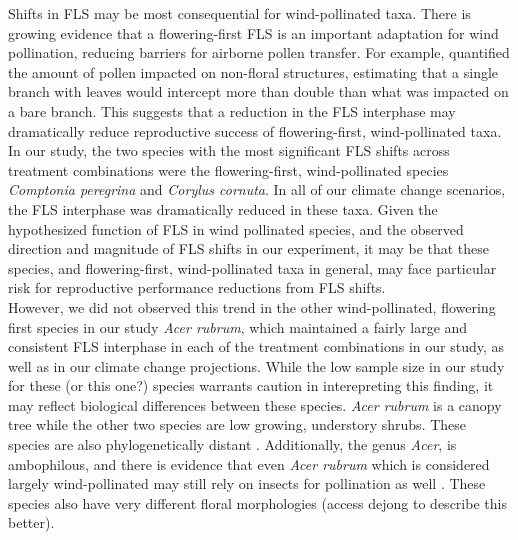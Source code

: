 \documentclass[11pt]{article}
\begin{document}
\noindent Shifts in FLS may be most consequential for wind-pollinated taxa. There is growing evidence that a flowering-first FLS is an important adaptation for wind pollination, reducing barriers for airborne pollen transfer\citep{Rathcke_1985}. For example, \citet{Tauber1967} quantified the amount of pollen impacted on non-floral structures, estimating that a single branch with leaves would intercept more than double than what was impacted on a bare branch. This suggests that a reduction in the FLS interphase may dramatically reduce reproductive success of flowering-first, wind-pollinated taxa.\\

\noindent In our study, the two species with the most significant FLS shifts across treatment combinations were the flowering-first, wind-pollinated species \textit{Comptonia peregrina} and \textit{Corylus cornuta}. In all of our climate change scenarios, the FLS interphase was dramatically reduced in these taxa. Given the hypothesized function of FLS in wind pollinated species, and the observed direction and magnitude of FLS shifts in our experiment, it may be that these species, and flowering-first, wind-pollinated taxa in general, may face particular risk for reproductive performance reductions from FLS shifts.\\ 

\noindent However, we did not observed this trend in the other wind-pollinated, flowering first species in our study \textit{Acer rubrum}, which maintained a fairly large and consistent FLS interphase in each of the treatment combinations in our study, as well as in our climate change projections. While the low sample size in our study for these (or this one?) species warrants caution in interepreting this finding, it may reflect biological differences between these species. \textit{Acer rubrum} is a canopy tree while the other two species are low growing, understory shrubs. These species are also phylogenetically distant \citep{}. Additionally, the genus \textit{Acer}, is ambophilous\citep{Dejung_1972}, and there is evidence that even \textit{Acer rubrum} which is considered largely wind-pollinated may still rely on insects for pollination as well \citep{}. These species also have very different floral morphologies (access dejong to describe this better).\\
\end{document}
